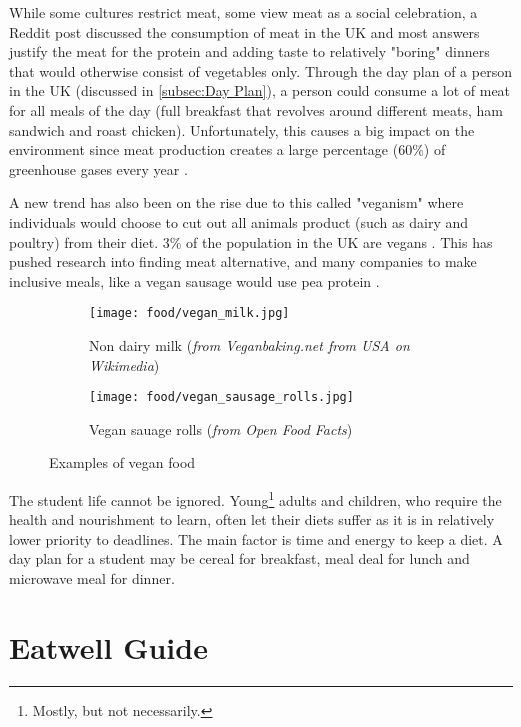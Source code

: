 \documentclass[../main.tex]{subfiles}
\begin{document}
While some cultures restrict meat, some view meat as a social celebration, a Reddit post discussed the consumption of meat in the UK \cite{WhoFeelsEvery2022} and most answers justify the meat for the protein and adding taste to relatively "boring" dinners that would otherwise consist of vegetables only. Through the day plan of a person in the UK (discussed in \ref{subsec:Day Plan}), a person could consume a lot of meat for all meals of the day (full breakfast that revolves around different meats, ham sandwich and roast chicken). Unfortunately, this causes a big impact on the environment since meat production creates a large percentage (60\%) of greenhouse gases every year \cite{milmanMeatAccountsNearly2021}.

A new trend has also been on the rise due to this called "veganism" where individuals would choose to cut out all animals product (such as dairy and poultry) from their diet. 3\% of the population in the UK are vegans \cite{DietaryChoicesBrits}. This has pushed research into finding meat alternative, and many companies to make inclusive meals, like a vegan sausage would use pea protein \cite{kassraieHowHealthyVegan}.

\begin{figure}
    \centering
    \noindent\begin{subfigure}{.55\textwidth}
    \texttt{[image: food/vegan\_milk.jpg]}
    \caption{Non dairy milk (\textit{from Veganbaking.net from USA on Wikimedia})}
    \end{subfigure}\hfill
    \begin{subfigure}{.42\textwidth}
    \texttt{[image: food/vegan\_sausage\_rolls.jpg]}
    \caption{Vegan sauage rolls (\textit{from Open Food Facts})}
    \end{subfigure}
    \caption{Examples of vegan food}
\end{figure}

The student life cannot be ignored. Young\footnote{Mostly, but not necessarily.} adults and children, who require the health and nourishment to learn, often let their diets suffer as it is in relatively lower priority to deadlines. The main factor is time and energy to keep a diet. A day plan for a student may be cereal for breakfast, meal deal for lunch and microwave meal for dinner.

\section{Eatwell Guide}
\end{document}

